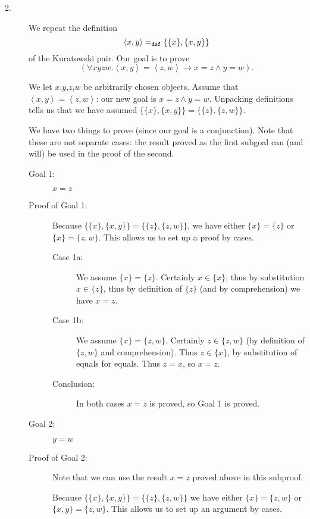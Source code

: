 \documentclass[12pt]{book}
\begin{document}
\begin{description}

\item[2.]  We repeat the definition $$\left<x,y\right> =_{\tt def}
\{\{x\},\{x,y\}\}$$ of the Kuratowski pair.  Our goal is to prove
$$(\forall xyzw.\left<x,y\right> = \left<z,w\right> \rightarrow x=z
\wedge y=w).$$

We let $x$,$y$,$z$,$w$ be arbitrarily chosen objects.  Assume that
$\left<x,y\right> = \left<z,w\right>$: our new goal is $x=z \wedge
y=w$.  Unpacking definitions tells us that we have assumed
$\{\{x\},\{x,y\}\}=\{\{z\},\{z,w\}\}$.

We have two things to prove (since our goal is a conjunction).  Note
that these are not separate cases: the result proved as the first
subgoal can (and will) be used in the proof of the second.

\begin{description}

\item[Goal 1:] $x=z$
\item[Proof of Goal 1:]
Because $\{\{x\},\{x,y\}\}=\{\{z\},\{z,w\}\}$, we have either
$\{x\}=\{z\}$ or $\{x\}=\{z,w\}$.  This allows us to set up a proof by
cases.

\begin{description}

\item[Case 1a:] We assume $\{x\}=\{z\}$.  Certainly $x \in \{x\}$;
thus by substitution $x \in \{z\}$, thus by definition of $\{z\}$ (and
by comprehension) we have $x=z$.

\item[Case 1b:] We assume $\{x\}=\{z,w\}$.  Certainly $z \in \{z,w\}$
(by definition of $\{z,w\}$ and comprehension).  Thus $z \in\{x\}$, by
substitution of equals for equals.  Thus $z=x$, so $x=z$.

\item[Conclusion:]  In both cases $x=z$ is proved, so Goal 1 is proved.

\end{description}


\item[Goal 2:] $y=w$

\item[Proof of Goal 2:] Note that we can use the result $x=z$ proved
above in this subproof.

Because $\{\{x\},\{x,y\}\}=\{\{z\},\{z,w\}\}$ we have either $\{x\} =
\{z,w\}$ or $\{x,y\} = \{z,w\}$.  This allows us to set up an argument
by cases.


\end{description}
\end{description}
\end{document}
